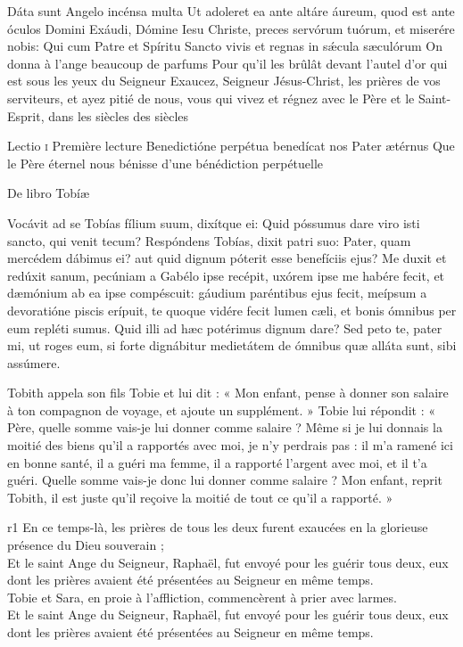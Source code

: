 \documentclass[twoside]{article}
\begin{document}
\begin{paracol}[1]{2}
\switchcolumn*

\versiculusabsolutio
	{Dáta sunt Angelo incénsa multa}
	{Ut adoleret ea ante altáre áureum, quod est ante óculos Domini}
	{Exáudi, Dómine Iesu Christe, preces servórum tuórum, et miserére nobis: Qui cum Patre et Spíritu Sancto vivis et regnas in sǽcula sæculórum}
	{On donna à l’ange beaucoup de parfums}
	{Pour qu’il les brûlât devant l’autel d’or qui est sous les yeux du Seigneur}
	{Exaucez, Seigneur Jésus-Christ, les prières de vos serviteurs, et ayez pitié de nous, vous qui vivez et régnez avec le Père et le Saint-Esprit, dans les siècles des siècles}

\lectioresponsorium
	{Lectio \textsc{i}}
	{Première lecture}
	{Benedictióne perpétua benedícat nos Pater ætérnus}
	{Que le Père éternel nous bénisse d'une bénédiction perpétuelle}
	{
		De libro Tobíæ

		Vocávit ad se Tobías fílium suum, dixítque ei: Quid póssumus dare viro isti sancto, qui venit tecum?
		Respóndens Tobías, dixit patri suo: Pater, quam mercédem dábimus ei? aut quid dignum póterit esse benefíciis ejus?
		Me duxit et redúxit sanum, pecúniam a Gabélo ipse recépit, uxórem ipse me habére fecit, 
		et dæmónium ab ea ipse compéscuit: gáudium paréntibus ejus fecit, meípsum a devoratióne piscis erípuit, 
		te quoque vidére fecit lumen cæli, et bonis ómnibus per eum repléti sumus. Quid illi ad hæc potérimus dignum dare?
		Sed peto te, pater mi, ut roges eum, si forte dignábitur medietátem de ómnibus quæ alláta sunt, sibi assúmere.
	}
	{	
		
		Tobith appela son fils Tobie et lui dit : « Mon enfant, pense à donner son salaire à ton compagnon de voyage, et ajoute un supplément. »
		Tobie lui répondit : « Père, quelle somme vais-je lui donner comme salaire ? Même si je lui donnais la moitié des biens qu’il a rapportés avec moi, je n’y perdrais pas :
		il m’a ramené ici en bonne santé, il a guéri ma femme, il a rapporté l’argent avec moi, et il t’a guéri. Quelle somme vais-je donc lui donner comme salaire ?
		Mon enfant, reprit Tobith, il est juste qu’il reçoive la moitié de tout ce qu’il a rapporté. »
	}
	{r1}
	{\rr En ce temps-là, les prières de tous les deux furent exaucées en la glorieuse présence du Dieu souverain ; \\
	\GreSpecial{*} Et le saint Ange du Seigneur, Raphaël, fut envoyé pour les guérir tous deux, eux dont les prières avaient été présentées au Seigneur en même temps. \\
	\vv Tobie et Sara, en proie à l’affliction, commencèrent à prier avec larmes.\\
	\GreSpecial{*} Et le saint Ange du Seigneur, Raphaël, fut envoyé pour les guérir tous deux, eux dont les prières avaient été présentées au Seigneur en même temps.}


\end{paracol}
\end{document}
